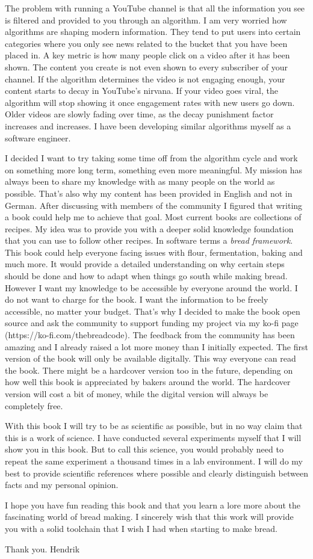 The problem with running a YouTube channel is that all the information
you see is filtered and provided to you through an algorithm. I am very
worried how algorithms are shaping modern information. They tend to
put users into certain categories where you only see news related
to the bucket that you have been placed in. A key metric is how many
people click on a video after it has been shown. The content you create
is not even shown to every subscriber of your channel. If the algorithm
determines the video is not engaging enough, your content starts to
decay in YouTube's nirvana. If your video goes viral, the algorithm
will stop showing it once engagement rates with new users go down.
Older videos are slowly fading over time, as the decay punishment
factor increases and increases. I have been developing similar algorithms
myself as a software engineer.

I decided I want to try taking some time off from the algorithm cycle and
work on something more long term, something even more meaningful.
My mission has always been to share my knowledge with as many people
on the world as possible. That's also why my content has been provided
in English and not in German. After discussing with members of the community
I figured that writing a book could help me to achieve that goal. Most
current books are collections of recipes. My idea was to provide you
with a deeper solid knowledge foundation that you can use to follow other recipes.
In software terms a {\it bread framework}. This book could help everyone
facing issues with flour, fermentation, baking and much more. It would provide
a detailed understanding on why certain steps should be done and how to
adapt when things go south while making bread.  However
I want my knowledge to be accessible by everyone around the world. I do
not want to charge for the book. I want the information to be freely accessible,
no matter your budget. That's why I decided to make the book open source
and ask the community to support funding my project via my ko-fi page
(https://ko-fi.com/thebreadcode).
The feedback from the community has been amazing and I already raised
a lot more money than
I initially expected. The first version of the book will only be available
digitally. This way everyone can read the book. There might be a hardcover
version too in the future, depending on how well this book is appreciated
by bakers around the world. The hardcover version will cost a bit of money,
while the digital version will always be completely free.

With this book I will try to be as scientific as possible, but in no way
claim that this is a work of science. I have conducted several experiments
myself that I will show you in this book. But to call this science, you would
probably need to repeat the same experiment a thousand times in a lab
environment. I will do my best to provide scientific references where possible
and clearly distinguish between facts and my personal opinion.

I hope you have fun reading this book and that you learn a lore more about
the fascinating world of bread making. I sincerely wish that this work
will provide you with a solid toolchain that I wish I had when starting
to make bread.

Thank you.
Hendrik